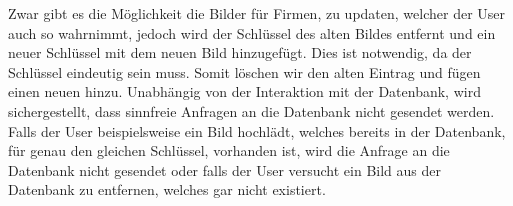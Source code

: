 \newline
Zwar gibt es die Möglichkeit die Bilder für Firmen, zu updaten, welcher der User auch so wahrnimmt, jedoch wird der Schlüssel des alten Bildes entfernt und ein neuer Schlüssel mit dem neuen Bild hinzugefügt.
Dies ist notwendig, da der Schlüssel eindeutig sein muss.
Somit löschen wir den alten Eintrag und fügen einen neuen hinzu.
Unabhängig von der Interaktion mit der Datenbank, wird sichergestellt, dass sinnfreie Anfragen an die Datenbank nicht gesendet werden.
Falls der User beispielsweise ein Bild hochlädt, welches bereits in der Datenbank, für genau den gleichen Schlüssel, vorhanden ist, wird die Anfrage an die Datenbank nicht gesendet oder falls der User versucht ein Bild aus der Datenbank zu entfernen, welches gar nicht existiert.
\newline
\newline
